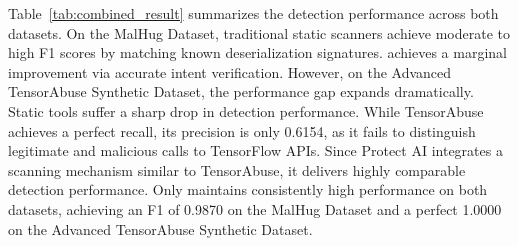 Table~\ref{tab:combined_result} summarizes the detection performance across both datasets. On the MalHug Dataset, traditional static scanners achieve moderate to high F1 scores by matching known deserialization signatures. \toolname{} achieves a marginal improvement via accurate intent verification. However, on the Advanced TensorAbuse Synthetic Dataset, the performance gap expands dramatically. Static tools suffer a sharp drop in detection performance. While TensorAbuse achieves a perfect recall, its precision is only 0.6154, as it fails to distinguish legitimate and malicious calls to TensorFlow APIs. Since Protect AI integrates a scanning mechanism similar to TensorAbuse, it delivers highly comparable detection performance. Only \toolname{} maintains consistently high performance on both datasets, achieving an F1 of 0.9870 on the MalHug Dataset and a perfect 1.0000 on the Advanced TensorAbuse Synthetic Dataset. 

%

